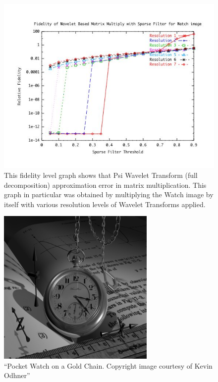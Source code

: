 \begin{figure}
\includegraphics [width=6in]{watchResultsA.jpg}
\caption{This fidelity level graph shows that Psi Wavelet Transform (full decomposition) approximation error in matrix multiplication.  This graph in particular was obtained by multiplying the Watch image by itself with various resolution levels of Wavelet Transforms applied.  \cite{watch} }
\label{image_watch_fidelity}
\end{figure}

\begin{figure}
\includegraphics [width=3in]{watch.jpg}
\caption{``Pocket Watch on a Gold Chain. Copyright image courtesy of Kevin Odhner''   \cite{watch}}
\label{image Peppers}
\end{figure}

